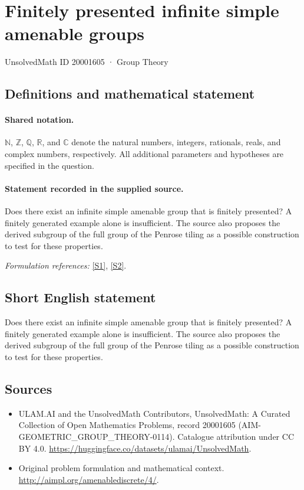 \documentclass[11pt]{article}
\newcommand{\sref}[2]{\hyperlink{source:#1:#2}{[S#2]}}
\begin{document}
\setcounter{section}{20001604}
\section{Finitely presented infinite simple amenable groups}\label{20001605}
{\small UnsolvedMath ID 20001605 · Group Theory}
\subsection{Definitions and mathematical statement}

\paragraph{Shared notation.}$\mathbb N$, $\mathbb Z$, $\mathbb Q$, $\mathbb R$, and $\mathbb C$ denote the natural numbers, integers, rationals, reals, and complex numbers, respectively. All additional parameters and hypotheses are specified in the question.


\paragraph{Statement recorded in the supplied source.}
Does there exist an infinite simple amenable group that is finitely presented? A finitely generated example alone is insufficient. The source also proposes the derived subgroup of the full group of the Penrose tiling as a possible construction to test for these properties.
\par\smallskip\textit{Formulation references:} \sref{20001605}{1}, \sref{20001605}{2}.
\subsection{Short English statement}
Does there exist an infinite simple amenable group that is finitely presented? A finitely generated example alone is insufficient. The source also proposes the derived subgroup of the full group of the Penrose tiling as a possible construction to test for these properties.
\subsection{Sources}
\begin{itemize}
\item[\hypertarget{source:20001605:1}{S1}] ULAM.AI and the UnsolvedMath Contributors, UnsolvedMath: A Curated Collection of Open Mathematics Problems, record 20001605 (AIM-GEOMETRIC\_GROUP\_THEORY-0114). Catalogue attribution under CC BY 4.0.
\url{https://huggingface.co/datasets/ulamai/UnsolvedMath}.
\item[\hypertarget{source:20001605:2}{S2}] Original problem formulation and mathematical context.
\url{http://aimpl.org/amenablediscrete/4/}.
\end{itemize}
\label{end:20001605}
\end{document}

